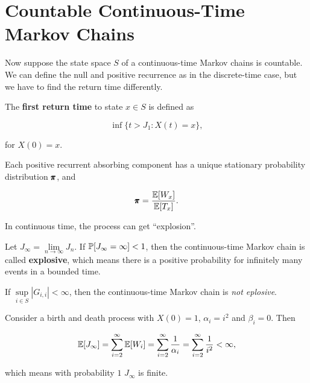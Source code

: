 \section{Countable Continuous-Time Markov Chains}

Now suppose the state space $S$ of a continuous-time Markov chains is countable. We can define the null and positive recurrence as in the discrete-time case, but we have to find the return time differently. 

\begin{definition}
    The \textbf{first return time} to state $x \in S$ is defined as 

    \begin{equation*}
        \inf\{t > J_1: X(t) = x\},
    \end{equation*}

    for $X(0) = x$. 
\end{definition}

\begin{proposition}
    Each positive recurrent absorbing component has a unique stationary probability distribution $\pmb{\pi}$, and 

    \begin{equation*}
        \pmb{\pi} = \frac{\mathbb{E} [W_x]}{\mathbb{E}[T_x]}.
    \end{equation*}
\end{proposition}

In continuous time, the process can get ``explosion''. 

\begin{definition}[Explosion]
    Let $J_\infty = \lim\limits_{n\to\infty} J_n$. If $\mathbb{P} [J_\infty = \infty] < 1$, then the continuous-time Markov chain is called \textbf{explosive}, which means there is a positive probability for infinitely many events in a bounded time.
\end{definition}

\begin{proposition}
    If $\sup\limits_{i \in S} |G_{i,i}| < \infty$, then the continuous-time Markov chain is \textit{not eplosive}.
\end{proposition}

\begin{example}[Explosion]
    Consider a birth and death process with  $X(0) = 1$, $\alpha_i = i^2$ and $\beta_i = 0$. Then 

    \begin{equation*}
        \mathbb{E}[J_\infty] = \sum_{i = 2}^\infty \mathbb{E} [W_i] = \sum_{i = 2}^\infty \frac{1}{\alpha_i} = \sum_{i = 2}^\infty \frac{1}{i^2} < \infty,
    \end{equation*}

    which means with probability $1$ $J_\infty$ is finite.
\end{example}